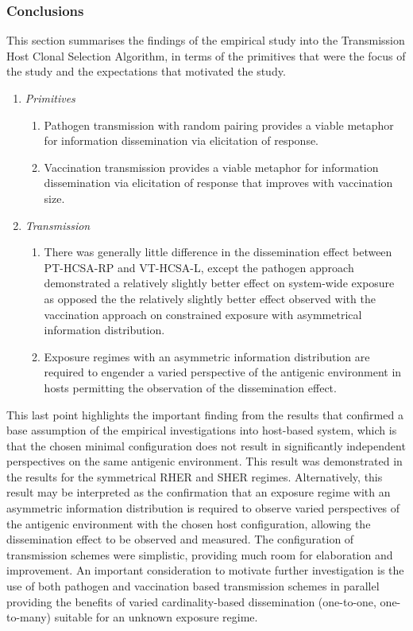 %
%
\subsubsection{Conclusions}
This section summarises the findings of the empirical study into the Transmission Host Clonal Selection Algorithm, in terms of the primitives that were the focus of the study and the expectations that motivated the study.

\begin{enumerate}
	\item \emph{Primitives}
		\begin{enumerate}
			\item Pathogen transmission with random pairing provides a viable metaphor for information dissemination via elicitation of response.
			\item Vaccination transmission provides a viable metaphor for information dissemination via elicitation of response that improves with vaccination size.
		\end{enumerate}
	\item \emph{Transmission}
		\begin{enumerate}
			\item There was generally little difference in the dissemination effect between PT-HCSA-RP and VT-HCSA-L, except the pathogen approach demonstrated a relatively slightly better effect on system-wide exposure as opposed the the relatively slightly better effect observed with the vaccination approach on constrained exposure with asymmetrical information distribution.
			\item Exposure regimes with an asymmetric information distribution are required to engender a varied perspective of the antigenic environment in hosts permitting the observation of the dissemination effect.			
		\end{enumerate}				
\end{enumerate}

This last point highlights the important finding from the results that confirmed a base assumption of the empirical investigations into host-based system, which is that the chosen minimal configuration does not result in significantly independent perspectives on the same antigenic environment. This result was demonstrated in the results for the symmetrical RHER and SHER regimes. Alternatively, this result may be interpreted as the confirmation that an exposure regime with an asymmetric information distribution is required to observe varied perspectives of the antigenic environment with the chosen host configuration, allowing the dissemination effect to be observed and measured.
The configuration of transmission schemes were simplistic, providing much room for elaboration and improvement. An important consideration to motivate further investigation is the use of both pathogen and vaccination based transmission schemes in parallel providing the benefits of varied cardinality-based dissemination (one-to-one, one-to-many) suitable for an unknown exposure regime.

